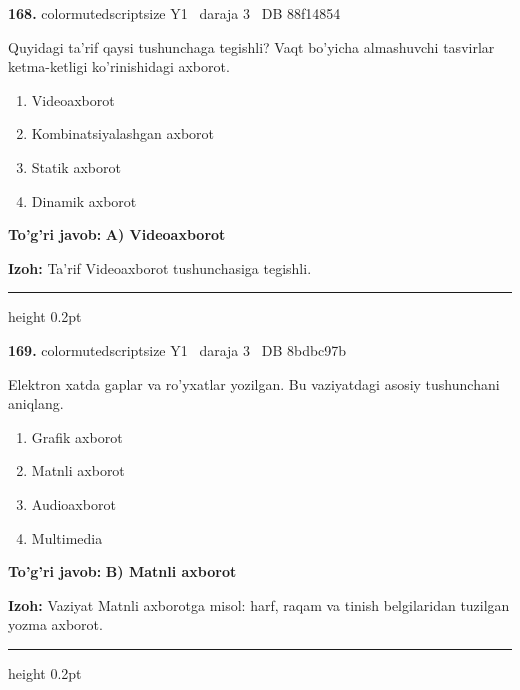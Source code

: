 \documentclass[10pt,a4paper,oneside]{article}
\begin{document}
\noindent\textbf{\color{ink}168.}  {color{muted}scriptsize Y1 \textbullet\ daraja 3 \textbullet\ DB 88f14854}
\par
Quyidagi ta'rif qaysi tushunchaga tegishli? Vaqt bo'yicha almashuvchi tasvirlar ketma-ketligi ko'rinishidagi axborot.
\begin{enumerate}[label=\Alph*),leftmargin=9mm]
\item Videoaxborot
\item Kombinatsiyalashgan axborot
\item Statik axborot
\item Dinamik axborot
\end{enumerate}
\begin{tcolorbox}[enhanced,breakable,colback=teal!4,colframe=teal!50!black,boxrule=0.5pt,arc=1.1mm,left=3mm,right=3mm,top=1.7mm,bottom=1.7mm,before skip=2mm,after skip=2mm]
\textbf{\color{teal}To'g'ri javob:} \textbf{A) Videoaxborot}
\par\smallskip
\textbf{Izoh:} Ta'rif Videoaxborot tushunchasiga tegishli.
\end{tcolorbox}
\vspace{2mm}\hrule height 0.2pt \vspace{3mm}

\noindent\textbf{\color{ink}169.}  {color{muted}scriptsize Y1 \textbullet\ daraja 3 \textbullet\ DB 8bdbc97b}
\par
Elektron xatda gaplar va ro'yxatlar yozilgan. Bu vaziyatdagi asosiy tushunchani aniqlang.
\begin{enumerate}[label=\Alph*),leftmargin=9mm]
\item Grafik axborot
\item Matnli axborot
\item Audioaxborot
\item Multimedia
\end{enumerate}
\begin{tcolorbox}[enhanced,breakable,colback=teal!4,colframe=teal!50!black,boxrule=0.5pt,arc=1.1mm,left=3mm,right=3mm,top=1.7mm,bottom=1.7mm,before skip=2mm,after skip=2mm]
\textbf{\color{teal}To'g'ri javob:} \textbf{B) Matnli axborot}
\par\smallskip
\textbf{Izoh:} Vaziyat Matnli axborotga misol: harf, raqam va tinish belgilaridan tuzilgan yozma axborot.
\end{tcolorbox}
\vspace{2mm}\hrule height 0.2pt \vspace{3mm}
\end{document}
